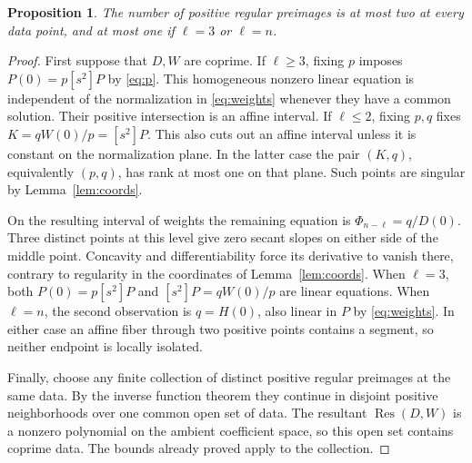 \documentclass[11pt,a4paper]{article}
\newtheorem{proposition}[theorem]{Proposition}
\newcommand{\Res}{\operatorname{Res}}
\begin{document}
\begin{proposition}\label{prop:upper}
The number of positive regular preimages is at most two at every data point,
and at most one if \(\ell=3\) or \(\ell=n\).
\end{proposition}
\begin{proof}
First suppose that \(D,W\) are coprime. If \(\ell\ge3\), fixing \(p\) imposes
\(P(0)=p[s^2]P\) by \eqref{eq:p}. This homogeneous nonzero linear equation
is independent of the normalization in \eqref{eq:weights} whenever they have
a common solution. Their positive intersection is an affine interval.
If \(\ell\le2\), fixing \(p,q\) fixes \(K=qW(0)/p=[s^2]P\). This also cuts
out an affine interval unless it is constant on the normalization plane.
In the latter case the pair \((K,q)\), equivalently \((p,q)\), has rank at
most one on that plane. Such points are singular by Lemma~\ref{lem:coords}.

On the resulting interval of weights the remaining equation is
\(\Phi_{n-\ell}=q/D(0)\). Three distinct points at this level give zero
secant slopes on either side of the middle point. Concavity and
differentiability force its derivative to vanish there, contrary to
regularity in the coordinates of Lemma~\ref{lem:coords}. When \(\ell=3\),
both \(P(0)=p[s^2]P\) and \([s^2]P=qW(0)/p\) are linear equations.
When \(\ell=n\), the second observation is \(q=H(0)\), also linear in \(P\)
by \eqref{eq:weights}. In either case an affine fiber through two positive
points contains a segment, so neither endpoint is locally isolated.

Finally, choose any finite collection of distinct positive regular
preimages at the same data. By the inverse function theorem they continue
in disjoint positive neighborhoods over one common open set of data.
The resultant \(\Res(D,W)\) is a nonzero polynomial on the ambient coefficient
space, so this open set contains coprime data. The bounds already proved
apply to the collection.
\end{proof}
\end{document}
